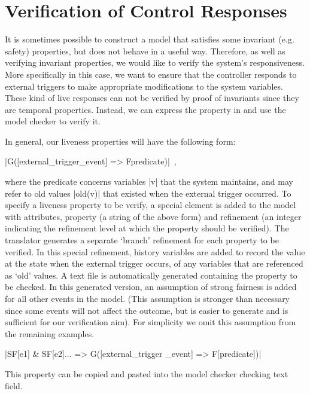 

\section{Verification of Control Responses}
\label{sec:verificationResponses}

It is sometimes possible to construct a model that satisfies some invariant (e.g. safety) properties, but does not behave in a useful way.
Therefore, as well as verifying invariant properties, we would like to verify the system's responsiveness.  More specifically in this case, we want to ensure that the controller responds to external triggers to make appropriate modifications to the system variables. 
These kind of live responses can not be verified by proof of invariants since they are temporal properties.
Instead, we can express the property in \LTL  and use the \PROB model checker to verify it.

In general, our liveness properties will have the following form:
\begin{center}
  |G([external_trigger_event] => F{predicate})|~,
\end{center}
where the predicate concerns variables |v| that the system maintains, and may refer to old values |old(v)| that existed when the external trigger occurred.
To specify a liveness property to be verify, a special \LTL element is added to the \SCXML model with attributes, property (a string of the above form)  and refinement (an integer indicating the refinement level at which the property should be verified).
The translator generates a separate `branch' refinement for each \LTL property to be verified. 
In this special refinement, history variables are added to record the value at the state when the external trigger occurs, of any variables that are referenced as `old' values.
A text file is automatically generated containing the \LTL property to be checked. 
In this generated version, an assumption of strong fairness is added for all other events in the model.
(This assumption is stronger than necessary since some events will not affect the outcome, but is easier to generate and is sufficient for our verification aim). 
For simplicity we omit this assumption from the remaining examples.
\begin{center}
  |SF[e1] & SF[e2]... => G([external_trigger _event] => F[predicate])|
\end{center}
This property can be copied and pasted into the \PROB model checker \LTL checking text field.

